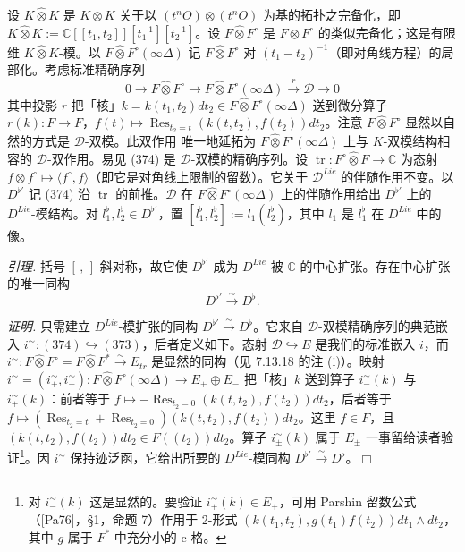 设 $K\widehat{\otimes}K$ 是 $K\otimes K$ 关于以 $(t^{n}O)\otimes(t^{n}O)$ 为基的拓扑之完备化，即 $K\widehat{\otimes}K:=\mathbb{C}[[t_{1},t_{2}]][t_{1}^{-1}][t_{2}^{-1}]$。设 $F\widehat{\otimes}F^{\circ}$ 是 $F\otimes F^{\circ}$ 的类似完备化；这是有限维 $K\widehat{\otimes}K$-模。以 $F\widehat{\otimes}F^{\circ}(\infty\Delta)$ 记 $F\widehat{\otimes}F^{\circ}$ 对 $(t_{1}-t_{2})^{-1}$（即对角线方程）的局部化。考虑标准精确序列
\begin{equation}\tag{374}
0\to F\widehat{\otimes}F^{\circ}\to F\widehat{\otimes}F^{\circ}(\infty\Delta)\xrightarrow{r}\mathcal{D}\to 0
\end{equation}
其中投影 $r$ 把「核」$k=k(t_{1},t_{2})dt_{2}\in F\widehat{\otimes}F^{\circ}(\infty\Delta)$ 送到微分算子 $r(k):F\to F$，$f(t)\mapsto\operatorname{Res}_{t_{2}=t}(k(t,t_{2}),f(t_{2}))dt_{2}$。注意 $F\widehat{\otimes}F^{\circ}$ 显然以自然的方式是 $\mathcal{D}$-双模。此双作用%
唯一地延拓为 $F\widehat{\otimes}F^{\circ}(\infty\Delta)$ 上与 $K$-双模结构相容的 $\mathcal{D}$-双作用。易见 (374) 是 $\mathcal{D}$-双模的精确序列。设 $\operatorname{tr}:F^{\circ}\widehat{\otimes}F\to\mathbb{C}$ 为态射 $f\otimes f^{\circ}\mapsto\langle f^{\circ},f\rangle$（即它是对角线上限制的留数）。它关于 $\mathcal{D}^{Lie}$ 的伴随作用不变。以 $D^{\flat'}$ 记 (374) 沿 $\operatorname{tr}$ 的前推。$\mathcal{D}$ 在 $F\widehat{\otimes}F^{\circ}(\infty\Delta)$ 上的伴随作用给出 $D^{\flat'}$ 上的 $D^{Lie}$-模结构。对 $l^{\flat}_{1},l^{\flat}_{2}\in D^{\flat'}$，置 $[l^{\flat}_{1},l^{\flat}_{2}]:=l_{1}(l^{\flat}_{2})$，其中 $l_{1}$ 是 $l^{\flat}_{1}$ 在 $D^{Lie}$ 中的像。

 \emph{引理.} 括号 $[\,,\,]$ 斜对称，故它使 $D^{\flat'}$ 成为 $D^{Lie}$ 被 $\mathbb{C}$ 的中心扩张。存在中心扩张的唯一同构
\[
D^{\flat'}\xrightarrow{\sim}D^{\flat}.
\]

\emph{证明.} 只需建立 $D^{Lie}$-模扩张的同构 $D^{\flat'}\xrightarrow{\sim}D^{\flat}$。它来自 $\mathcal{D}$-双模精确序列的典范嵌入 $i^{\sim}:(374)\hookrightarrow(373)$，后者定义如下。态射 $\mathcal{D}\hookrightarrow E$ 是我们的标准嵌入 $i$，而 $i^{\sim}:F\widehat{\otimes}F^{\circ}=F\widehat{\otimes}F^{*}\xrightarrow{\sim}E_{tr}$ 是显然的同构（见 7.13.18 的注 (i)）。映射 $i^{\sim}=(i^{\sim}_+,i^{\sim}_-):F\widehat{\otimes}F^{\circ}(\infty\Delta)\to E_+\oplus E_-$ 把「核」$k$ 送到算子 $i^{\sim}_-(k)$ 与 $i^{\sim}_+(k)$：前者等于 $f\mapsto-\operatorname{Res}_{t_{2}=0}(k(t,t_{2}),f(t_{2}))dt_{2}$，后者等于 $f\mapsto(\operatorname{Res}_{t_{2}=t}+\operatorname{Res}_{t_{2}=0})(k(t,t_{2}),f(t_{2}))dt_{2}$。这里 $f\in F$，且 $(k(t,t_{2}),f(t_{2}))dt_{2}\in F((t_{2}))dt_{2}$。算子 $i^{\sim}_{\pm}(k)$ 属于 $E_{\pm}$ 一事留给读者验证\footnote{对 $i^{\sim}_-(k)$ 这是显然的。要验证 $i^{\sim}_+(k)\in E_+$，可用 Parshin 留数公式（[Pa76]，§1，命题 7）作用于 2-形式 $(k(t_{1},t_{2}),g(t_{1})f(t_{2}))dt_{1}\wedge dt_{2}$，其中 $g$ 属于 $F^{*}$ 中充分小的 c-格。}。因 $i^{\sim}$ 保持迹泛函，它给出所要的 $D^{Lie}$-模同构 $D^{\flat'}\xrightarrow{\sim}D^{\flat}$。\hfill$\Box$

